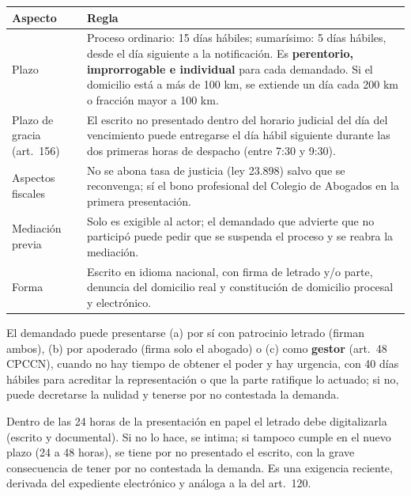 \documentclass[12pt,oneside]{book}
\renewcommand{\arraystretch}{1.15}
\begin{document}
\begin{table}[H]
\centering
\renewcommand{\arraystretch}{1.25}
\begin{tabularx}{\textwidth}{>{\RaggedRight\arraybackslash}p{}>{\RaggedRight\arraybackslash}X}
\toprule
\textbf{Aspecto} & \textbf{Regla} \\
\midrule
Plazo & Proceso ordinario: 15 días hábiles; sumarísimo: 5 días hábiles, desde el día siguiente a la notificación. Es \textbf{perentorio, improrrogable e individual} para cada demandado. Si el domicilio está a más de 100 km, se extiende un día cada 200 km o fracción mayor a 100 km. \\
\addlinespace
Plazo de gracia (art.~156) & El escrito no presentado dentro del horario judicial del día del vencimiento puede entregarse el día hábil siguiente durante las dos primeras horas de despacho (entre 7:30 y 9:30). %
\\
\addlinespace
Aspectos fiscales & No se abona tasa de justicia (ley 23.898) salvo que se reconvenga; sí el bono profesional del Colegio de Abogados en la primera presentación. %
\\
\addlinespace
Mediación previa & Solo es exigible al actor; el demandado que advierte que no participó puede pedir que se suspenda el proceso y se reabra la mediación. \\
\addlinespace
Forma & Escrito en idioma nacional, con firma de letrado y/o parte, denuncia del domicilio real y constitución de domicilio procesal y electrónico. \\
\bottomrule
\end{tabularx}
\end{table}

El demandado puede presentarse (a) por sí con patrocinio letrado (firman ambos), (b) por apoderado (firma solo el abogado) o (c) como \textbf{gestor} (art.~48 CPCCN), cuando no hay tiempo de obtener el poder y hay urgencia, con 40 días hábiles para acreditar la representación o que la parte ratifique lo actuado; si no, puede decretarse la nulidad y tenerse por no contestada la demanda.

Dentro de las 24 horas de la presentación en papel el letrado debe digitalizarla (escrito y documental). Si no lo hace, se intima; si tampoco cumple en el nuevo plazo (24 a 48 horas), se tiene por no presentado el escrito, con la grave consecuencia de tener por no contestada la demanda. Es una exigencia reciente, derivada del expediente electrónico y análoga a la del art.~120.
\end{document}
